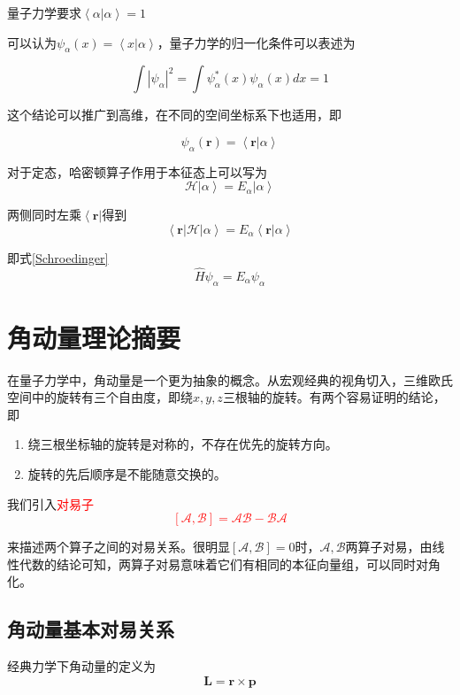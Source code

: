 \documentclass[UTF8,12pt]{article}
\providecommand\Ket[1]{\left|\right. #1 \left.\right\rangle}
\providecommand\Bra[1]{\left\langle\right. #1 \left.\right|}
\providecommand\Bracket[2]{\left\langle #1 \big| #2 \right\rangle}
\providecommand\BraCket[3]{\left\langle #1 \big| #2 \big| #3 \right\rangle}
\numberwithin{equation}{subsection}
\providecommand{\empR}[1]{\textcolor{red}{#1}}
\begin{document}
	量子力学要求$\Bracket{\alpha}{\alpha}=1$
	
	可以认为$\psi_\alpha(x)=\Bracket{x}{\alpha}$，量子力学的归一化条件可以表述为
	\begin{snugshade}
		\begin{equation}
			\int |\psi_\alpha|^2=\int \psi^*_\alpha(x)\psi_\alpha(x)dx=1
			\label{normalize}
		\end{equation}
	\end{snugshade}
	
	这个结论可以推广到高维，在不同的空间坐标系下也适用，即
	\begin{snugshade}
		\begin{equation}
			\psi_\alpha(\boldsymbol{r}) = \Bracket{\boldsymbol{r}}{\alpha}
			\label{wave}
		\end{equation}
	\end{snugshade}
	
	对于定态，哈密顿算子作用于本征态上可以写为$$\mathcal H\Ket{\alpha} = E_\alpha\Ket{\alpha}$$
	
	两侧同时左乘$\Bra{\boldsymbol{r}}$得到$$\BraCket{\boldsymbol{r}}{\mathcal H}{\alpha}=E_\alpha\Bracket{\boldsymbol{r}}{\alpha}$$
	
	即式\ref{Schroedinger}$$\hat{H}\psi_\alpha=E_\alpha\psi_\alpha$$
	
	\section{角动量理论摘要}
	在量子力学中，角动量是一个更为抽象的概念。从宏观经典的视角切入，三维欧氏空间中的旋转有三个自由度，即绕$x,y,z$三根轴的旋转。有两个容易证明的结论，即
	\begin{enumerate}
		\item 绕三根坐标轴的旋转是对称的，不存在优先的旋转方向。
		\item 旋转的先后顺序是不能随意交换的。
	\end{enumerate}
	
	我们引入\empR{对易子$$[\mathcal A,\mathcal B]=\mathcal{AB}-\mathcal{BA}$$}
	
	来描述两个算子之间的对易关系。很明显$[\mathcal A,\mathcal B]=0$时，$\mathcal A,\mathcal B$两算子对易，由线性代数的结论可知，两算子对易意味着它们有相同的本征向量组，可以同时对角化。
	\subsection{角动量基本对易关系}
	经典力学下角动量的定义为$$\boldsymbol{L}=\boldsymbol{r}\times \boldsymbol{p}$$
	
\end{document}
